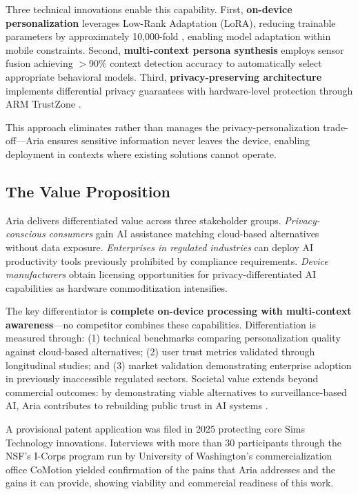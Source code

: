 \documentclass[11pt]{article}
\begin{document}
Three technical innovations enable this capability. First, \textbf{on-device personalization} leverages Low-Rank Adaptation (LoRA), reducing trainable parameters by approximately 10,000-fold \cite{hu2022lora}, enabling model adaptation within mobile constraints. Second, \textbf{multi-context persona synthesis} employs sensor fusion achieving $>$90\% context detection accuracy \cite{wang2019deep} to automatically select appropriate behavioral models. Third, \textbf{privacy-preserving architecture} implements differential privacy guarantees \cite{abadi2016deep} with hardware-level protection through ARM TrustZone \cite{pinto2019demystifying}.

This approach eliminates rather than manages the privacy-personalization trade-off---Aria ensures sensitive information never leaves the device, enabling deployment in contexts where existing solutions cannot operate.

\vspace*{-10pt}
\subsection{The Value Proposition}
\vspace*{-8pt}
Aria delivers differentiated value across three stakeholder groups. \textit{Privacy-conscious consumers} gain AI assistance matching cloud-based alternatives without data exposure. \textit{Enterprises in regulated industries} can deploy AI productivity tools previously prohibited by compliance requirements. \textit{Device manufacturers} obtain licensing opportunities for privacy-differentiated AI capabilities as hardware commoditization intensifies.

The key differentiator is \textbf{complete on-device processing with multi-context awareness}---no competitor combines these capabilities. Differentiation is measured through: (1) technical benchmarks comparing personalization quality against cloud-based alternatives; (2) user trust metrics validated through longitudinal studies; and (3) market validation demonstrating enterprise adoption in previously inaccessible regulated sectors. Societal value extends beyond commercial outcomes: by demonstrating viable alternatives to surveillance-based AI, Aria contributes to rebuilding public trust in AI systems \cite{gillespie2023trust}.

A provisional patent application was filed in 2025 protecting core Sims Technology innovations. Interviews with more than 30 participants through the NSF's I-Corps program run by University of Washington's commercialization office CoMotion yielded confirmation of the pains that Aria addresses and the gains it can provide, showing viability and commercial readiness of this work.
\end{document}
